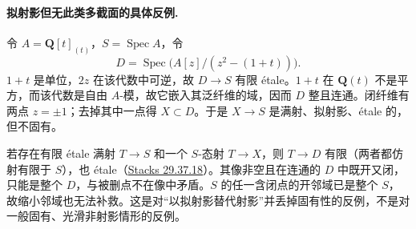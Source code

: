 \documentclass[openany,fontset=fandol]{ctexbook}
\DeclareMathOperator{\Spec}{Spec}
\begin{document}
\clearpage
\paragraph{拟射影但无此类多截面的具体反例.}
令 $A=\mathbf Q[t]_{(t)}$，$S=\Spec A$，令
\[
 D=\Spec\bigl(A[z]/(z^2-(1+t))\bigr).
\]
$1+t$ 是单位，$2z$ 在该代数中可逆，故 $D\to S$ 有限 étale。$1+t$ 在 $\mathbf Q(t)$ 不是平方，而该代数是自由 $A$-模，故它嵌入其泛纤维的域，因而 $D$ 整且连通。闭纤维有两点 $z=\pm1$；去掉其中一点得 $X\subset D$。于是 $X\to S$ 是满射、拟射影、étale 的，但不固有。

若存在有限 étale 满射 $T\to S$ 和一个 $S$-态射 $T\to X$，则 $T\to D$ 有限（两者都仿射有限于 $S$），也 étale（\href{https://stacks.math.columbia.edu/tag/0HB1}{Stacks 29.37.18}）。其像非空且在连通的 $D$ 中既开又闭，只能是整个 $D$，与被删点不在像中矛盾。$S$ 的任一含闭点的开邻域已是整个 $S$，故缩小邻域也无法补救。这是对“以拟射影替代射影”并丢掉固有性的反例，不是对一般固有、光滑非射影情形的反例。
\end{document}
